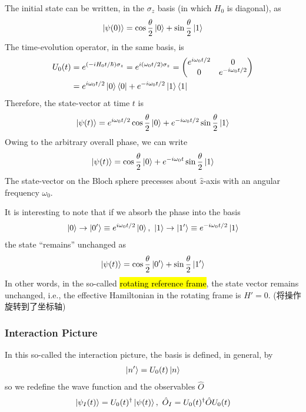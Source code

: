 The initial state can be written, in the $\sigma_z$ basis (in which $H_0$ is diagonal), as
\begin{align*}
    \ket{\psi(0)}=\cos\frac{\theta}{2}\ket{0}+\sin\frac{\theta}{2}\ket{1}
\end{align*}
The time-evolution operator, in the same basis, is
\begin{align*}
    U_0(t)&=e^{(-iH_0t/\hbar)\sigma_z}=e^{i(\omega_0 t/2)\sigma_z}=\begin{pmatrix}
        e^{i\omega_0 t/2} & 0\\ 0& e^{-i\omega_0 t/2}
    \end{pmatrix}\\
    &=e^{i\omega_0 t/2}\ket{0}\bra{0}+e^{-i\omega_0 t/2}\ket{1}\bra{1}
\end{align*}
Therefore, the state-vector at time $t$ is 
\begin{align*}
    \ket{\psi(t)}=e^{i\omega_0 t/2}\cos\frac{\theta}{2}\ket{0}+e^{-i\omega_0 t/2}\sin\frac{\theta}{2}\ket{1}
\end{align*}
Owing to the arbitrary overall phase, we can write
\begin{align*}
    \ket{\psi(t)}=\cos\frac{\theta}{2}\ket{0}+e^{-i\omega_0 t}\sin\frac{\theta}{2}\ket{1}
\end{align*}
The state-vector on the Bloch sphere precesses about $\hat{z}$-axis with an angular frequency $\omega_0$.

It is interesting to note that if we absorb the phase into the basis
\begin{align*}
    \ket{0}\rightarrow\ket{0'}\equiv e^{i\omega_0 t/2}\ket{0},\ \ket{1}\rightarrow\ket{1'}\equiv e^{-i\omega_0 t/2}\ket{1}
\end{align*}
the state “remains” unchanged as
\begin{align*}
    \ket{\psi(t)}=\cos\frac{\theta}{2}\ket{0'}+\sin\frac{\theta}{2}\ket{1'}
\end{align*}
In other words, in the so-called \hl{rotating reference frame}, the state vector remains unchanged, i.e., the effective Hamiltonian in the rotating frame is $H'=0$. (将操作旋转到了坐标轴)

\subsubsection{Interaction Picture}
In this so-called the interaction picture, the basis is defined, in general, by
\begin{align*}
    \ket{n'}=U_0(t)\ket{n}
\end{align*}
so we redefine the wave function and the observables $\hat{O}$
\begin{align*}
    \ket{\psi_I (t)}=U_0(t)^\dagger \ket{\psi(t)},\ \hat{O}_I=U_0(t)^\dagger \hat{O}U_0(t)
\end{align*}

